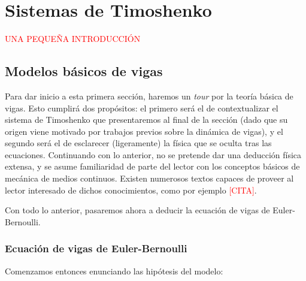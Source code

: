 \chapter{Sistemas de Timoshenko}
\label{ch:timoshenko}

\textcolor{red}{UNA PEQUEÑA INTRODUCCIÓN}

\section{Modelos básicos de vigas}
\label{ch:timoshenko:section:primerosmodelos}

Para dar inicio a esta primera sección, haremos un \textit{tour} por la teoría básica de vigas. Esto cumplirá dos propósitos: el primero será el de contextualizar el sistema de Timoshenko que presentaremos al final de la sección (dado que su origen viene motivado por trabajos previos sobre la dinámica de vigas), y el segundo será el de esclarecer (ligeramente) la física que se oculta tras las ecuaciones. Continuando con lo anterior, no se pretende dar una deducción física extensa, y se asume familiaridad de parte del lector con los conceptos básicos de mecánica de medios continuos. Existen numerosos textos capaces de proveer al lector interesado de dichos conocimientos, como por ejemplo \textcolor{red}{[CITA]}.

Con todo lo anterior, pasaremos ahora a deducir la ecuación de vigas de Euler-Bernoulli.

\subsection{Ecuación de vigas de Euler-Bernoulli}
\label{ch:timoshenko:section:primerosmodelos:subsection:eulerbernoulli}

Comenzamos entonces enunciando las hipótesis del modelo:

